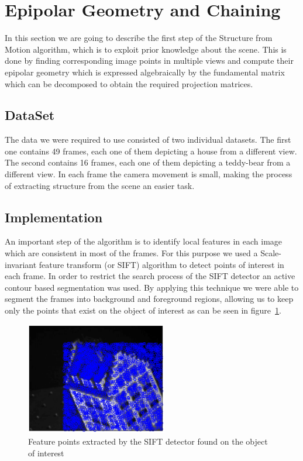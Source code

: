 \section{Epipolar Geometry and Chaining}
\label{egc}
In this section we are going to describe the first step of the Structure from Motion algorithm, which is to exploit prior knowledge about the scene. This is done by finding corresponding image points in multiple views and compute their epipolar geometry which is expressed algebraically by the fundamental matrix which can be decomposed to obtain the required projection matrices.

\subsection{DataSet}
The data we were required to use consisted of two individual datasets. The first one contains 49 frames, each one of them depicting a house from a different view. The second contains 16 frames, each one of them depicting a teddy-bear from a different view. In each frame the camera movement is small, making the process of extracting structure from the scene an easier task.

\subsection{Implementation}
An important step of the algorithm is to identify local features in each image which are consistent in most of the frames. For this purpose we used a Scale-invariant feature transform (or SIFT) algorithm to detect points of interest in each frame. In order to restrict the search process of the SIFT detector an active contour based segmentation was used. By applying this technique we were able to segment the frames into background and foreground regions, allowing us to keep only the points that exist on the object of interest as can be seen in figure~\ref{fig:houseBackground}.

\begin{figure}[ht!]
  \centering
    \includegraphics[width=0.55\textwidth]{figures/houseBackground.eps}
    \caption{Feature points extracted by the SIFT detector found on the object of interest}
    \label{fig:houseBackground}
\end{figure}

